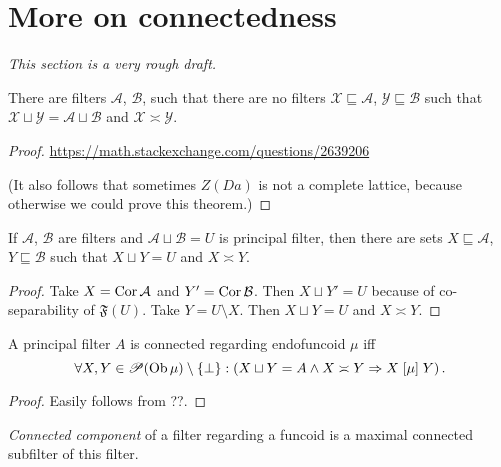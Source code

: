 \chapter{More on connectedness}

\emph{This section is a very rough draft.}

\begin{prop}
  There are filters $\mathcal{A}$, $\mathcal{B}$, such that there are no
  filters $\mathcal{X} \sqsubseteq \mathcal{A}$, $\mathcal{Y} \sqsubseteq
  \mathcal{B}$ such that $\mathcal{X} \sqcup \mathcal{Y} = \mathcal{A} \sqcup
  \mathcal{B}$ and $\mathcal{X} \asymp \mathcal{Y}$.
\end{prop}

\begin{proof}
  \url{https://math.stackexchange.com/questions/2639206}

  (It also follows that sometimes $Z (D a)$ is not a complete lattice, because
  otherwise we could prove this theorem.)
\end{proof}

\begin{prop}
  If $\mathcal{A}$, $\mathcal{B}$ are filters and $\mathcal{A} \sqcup
  \mathcal{B} = U$ is principal filter, then there are sets $X \sqsubseteq
  \mathcal{A}$, $Y \sqsubseteq \mathcal{B}$ such that $X \sqcup Y = U$ and $X
  \asymp Y$.
\end{prop}

\begin{proof}
  Take $X = \operatorname{Cor} \mathcal{A}$ and $Y' = \operatorname{Cor} \mathcal{B}$. Then $X
  \sqcup Y' = U$ because of co-separability of $\mathfrak{F} (U)$. Take $Y = U
  \setminus X$. Then $X \sqcup Y = U$ and $X \asymp Y$.
\end{proof}

\begin{prop}
  A principal filter $A$ is connected regarding endofuncoid $\mu$ iff
  \[ \forall X, Y \in \mathscr{P} (\operatorname{Ob} \mu) \setminus \{ \bot \} :
     \left( X \sqcup Y = A \wedge X \asymp Y \Rightarrow X \mathrel{[\mu]} Y
     \right) . \]
\end{prop}

\begin{proof}
  Easily follows from ??.
\end{proof}

\begin{defn}
  \emph{Connected component} of a filter regarding a funcoid is a maximal
  connected subfilter of this filter.
\end{defn}

